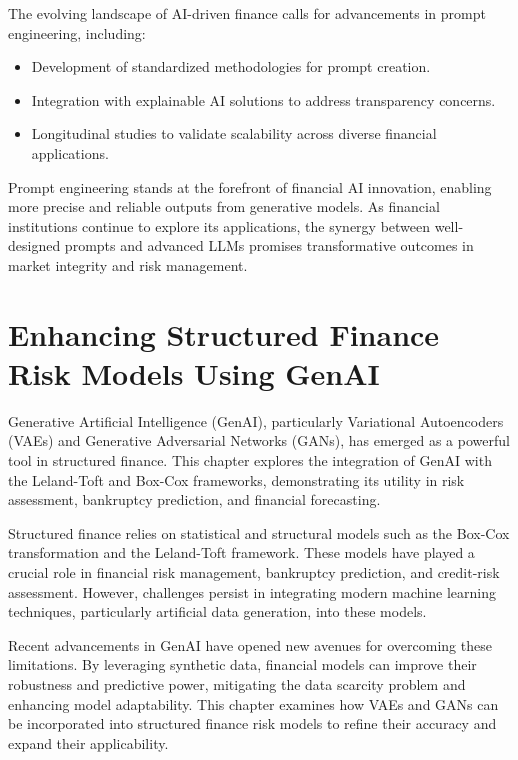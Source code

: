 \documentclass[a4paper,12pt]{scrbook}
\begin{document}
	The evolving landscape of AI-driven finance calls for advancements in prompt engineering, including:
	\begin{itemize}
		\item Development of standardized methodologies for prompt creation.
		\item Integration with explainable AI solutions to address transparency concerns.
		\item Longitudinal studies to validate scalability across diverse financial applications.
	\end{itemize}
	
	Prompt engineering stands at the forefront of financial AI innovation, enabling more precise and reliable outputs from generative models. As financial institutions continue to explore its applications, the synergy between well-designed prompts and advanced LLMs promises transformative outcomes in market integrity and risk management.
	
	
	
	\chapter{Enhancing Structured Finance Risk Models Using GenAI}
	
	Generative Artificial Intelligence (GenAI), particularly Variational Autoencoders (VAEs) and Generative Adversarial Networks (GANs), has emerged as a powerful tool in structured finance. This chapter explores the integration of GenAI with the Leland-Toft and Box-Cox frameworks, demonstrating its utility in risk assessment, bankruptcy prediction, and financial forecasting.
	
	Structured finance relies on statistical and structural models such as the Box-Cox transformation and the Leland-Toft framework. These models have played a crucial role in financial risk management, bankruptcy prediction, and credit-risk assessment. However, challenges persist in integrating modern machine learning techniques, particularly artificial data generation, into these models. 
	
	Recent advancements in GenAI have opened new avenues for overcoming these limitations. By leveraging synthetic data, financial models can improve their robustness and predictive power, mitigating the data scarcity problem and enhancing model adaptability. This chapter examines how VAEs and GANs can be incorporated into structured finance risk models to refine their accuracy and expand their applicability.
	
\end{document}
